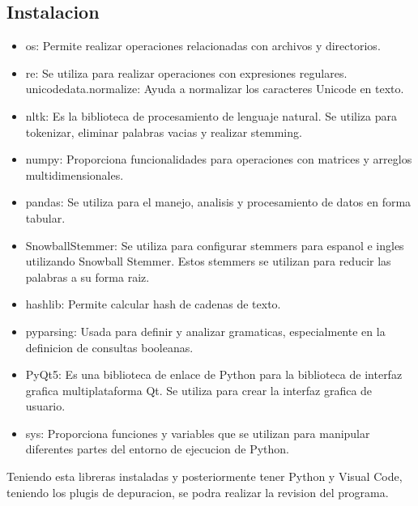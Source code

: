 \subsection{Instalacion}
\begin{itemize}
  \item os: Permite realizar operaciones relacionadas con archivos y directorios.
  \item re: Se utiliza para realizar operaciones con expresiones regulares. unicodedata.normalize: Ayuda a normalizar los caracteres Unicode en texto.
  \item nltk: Es la biblioteca de procesamiento de lenguaje natural. Se utiliza para tokenizar, eliminar palabras vacias y realizar stemming.
  \item numpy: Proporciona funcionalidades para operaciones con matrices y arreglos multidimensionales.
  \item pandas: Se utiliza para el manejo, analisis y procesamiento de datos en forma tabular.
  \item SnowballStemmer: Se utiliza para configurar stemmers para espanol e ingles utilizando Snowball Stemmer. Estos stemmers se utilizan para reducir las palabras a su forma raiz.
  \item hashlib: Permite calcular hash de cadenas de texto.
  \item pyparsing: Usada para definir y analizar gramaticas, especialmente en la definicion de consultas booleanas.
  \item PyQt5: Es una biblioteca de enlace de Python para la biblioteca de interfaz grafica multiplataforma Qt. Se utiliza para crear la interfaz grafica de usuario.
  \item sys: Proporciona funciones y variables que se utilizan para manipular diferentes partes del entorno de ejecucion de Python.
\end{itemize}
Teniendo esta libreras instaladas y posteriormente tener Python y Visual Code, teniendo los plugis de depuracion, se podra realizar la revision del programa.